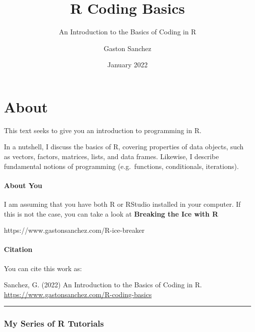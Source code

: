 \documentclass[
]{book}
\title{R Coding Basics}
\subtitle{An Introduction to the Basics of Coding in R}
\author{Gaston Sanchez}
\date{January 2022}
\begin{document}
\maketitle

{
\setcounter{tocdepth}{1}
\tableofcontents
}
\hypertarget{about}{%
\chapter*{About}\label{about}}

This text seeks to give you an introduction to programming in R.

In a nutshell, I discuss the basics of R, covering properties of data objects,
such as vectors, factors, matrices, lists, and data frames. Likewise, I
describe fundamental notions of programming (e.g.~functions, conditionals,
iterations).

\hypertarget{about-you}{%
\subsubsection*{About You}\label{about-you}}

I am assuming that you have both R or RStudio installed in your computer. If
this is not the case, you can take a look at \textbf{Breaking the Ice with R}

https://www.gastonsanchez.com/R-ice-breaker

\hypertarget{citation}{%
\subsubsection*{Citation}\label{citation}}

You can cite this work as:

Sanchez, G. (2022) An Introduction to the Basics of Coding in R.
\url{https://www.gastonsanchez.com/R-coding-basics}

\begin{center}\rule{0.5\linewidth}{0.5pt}\end{center}

\hypertarget{my-series-of-r-tutorials}{%
\subsection*{My Series of R Tutorials}\label{my-series-of-r-tutorials}}
\end{document}
